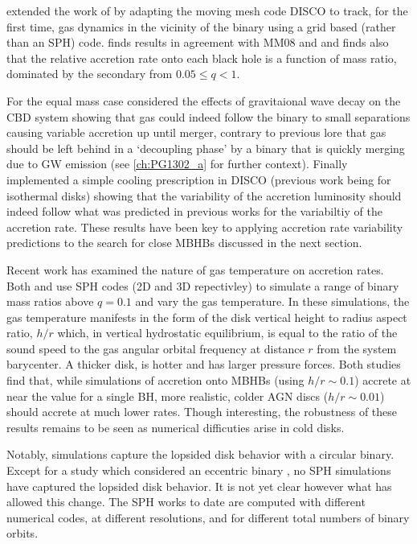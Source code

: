 \citep{Farris:2014} extended the work of \citep{DHM:2013:MNRAS} by adapting the
moving mesh code DISCO \citep{Duffell:2011:TESS,
DuffellMHDDISCO:2016} to track, for the first time, gas dynamics in the
vicinity of the binary using a grid based (rather than an SPH)
code. \citep{Farris:2014} finds results in agreement with MM08 and
\citep{DHM:2013:MNRAS} and finds also that the relative accretion rate onto
each black hole is a function of mass ratio, dominated by the secondary from
$0.05 \leq q < 1$. 


For the equal mass case \citep{Farris:2015:GW} considered the effects of
gravitaional wave decay on the CBD system showing that gas could indeed follow
the binary to small separations causing variable accretion up until merger,
contrary to previous lore that gas should be left behind in a `decoupling
phase' by a binary that is quickly merging due to GW emission (see
\ref{ch:PG1302_a} for further context). Finally \citep{Farris:2015:Cool}
implemented a simple cooling prescription in DISCO (previous work being for
isothermal disks) showing that the variability of the accretion luminosity
should indeed follow what was predicted in previous works for the variabiltiy
of the accretion rate. These results have been key to applying accretion rate
variability predictions to the search for close MBHBs discussed in the next
section.



Recent work has examined the nature of gas temperature on accretion rates.
Both \cite{YoungClarke:2015} and \cite{RagusaLodato:2016} use SPH codes (2D
and 3D repectivley) to simulate a range of binary mass ratios above $q=0.1$
and vary the gas temperature. In these simulations, the gas temperature
manifests in the form of the disk vertical height to radius aspect ratio,
$h/r$ which, in vertical hydrostatic equilibrium, is equal to the ratio of the
sound speed to the gas angular orbital frequency at distance $r$ from the
system barycenter. A thicker disk, is hotter and has larger pressure forces.
Both studies find that, while simulations of accretion onto MBHBs (using $h/r \sim
0.1$) accrete at near the value for a single BH, more realistic, colder AGN
discs ($h/r \sim 0.01$) should accrete at much lower rates. Though
interesting, the robustness of these results remains to be seen as numerical
difficuties arise in cold disks.%


Notably, \citep{RagusaLodato:2016} simulations capture the lopsided disk
behavior with a circular binary. Except for a study which considered an
eccentric binary \citep{Dunhill+2015}, no SPH simulations have captured the
lopsided disk behavior. It is not yet clear however what has allowed this
change. The SPH works to date are computed with different numerical codes, at
different resolutions, and for different total numbers of binary orbits.

